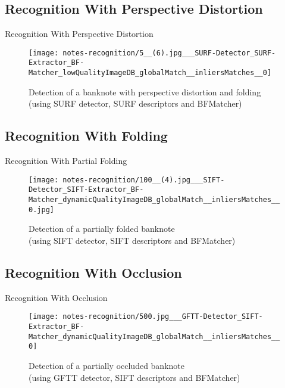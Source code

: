 \subsection*{Recognition With Perspective Distortion}
\begin{frame}{Recognition With Perspective Distortion}
	\begin{figure}[H]
		\centering
		\texttt{[image: notes-recognition/5\_\_(6).jpg\_\_\_SURF-Detector\_SURF-Extractor\_BF-Matcher\_lowQualityImageDB\_globalMatch\_\_inliersMatches\_\_0]}
		\caption{Detection of a banknote with perspective distortion and folding (using SURF detector, SURF descriptors and BFMatcher)}
		\label{fig:recognition-perspective-distortion}
	\end{figure}
\end{frame}


\subsection*{Recognition With Folding}
\begin{frame}{Recognition With Partial Folding}
	\begin{figure}[H]
		\centering
		\texttt{[image: notes-recognition/100\_\_(4).jpg\_\_\_SIFT-Detector\_SIFT-Extractor\_BF-Matcher\_dynamicQualityImageDB\_globalMatch\_\_inliersMatches\_\_0.jpg]}
		\caption{Detection of a partially folded banknote\\(using SIFT detector, SIFT descriptors and BFMatcher)}
		\label{fig:recognition-folding}
	\end{figure}
\end{frame}


\subsection*{Recognition With Occlusion}
\begin{frame}{Recognition With Occlusion}
	\begin{figure}[H]
		\centering
		\texttt{[image: notes-recognition/500.jpg\_\_\_GFTT-Detector\_SIFT-Extractor\_BF-Matcher\_dynamicQualityImageDB\_globalMatch\_\_inliersMatches\_\_0]}
		\caption{Detection of a partially occluded banknote\\(using GFTT detector, SIFT descriptors and BFMatcher)}
		\label{fig:recognition-partially-occluded-banknotes}
	\end{figure}
\end{frame}


